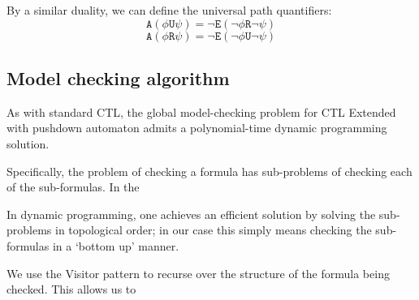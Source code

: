 \documentclass[11pt]{article}
\theoremstyle{definition}
\begin{document}
By a similar duality, we can define the universal path quantifiers:\cite{Kreutzer10}
\[ \texttt{A}(\phi\texttt{U}\psi) = \neg\texttt{E}(\neg\phi\texttt{R}\neg\psi) \]
\[ \texttt{A}(\phi\texttt{R}\psi) = \neg\texttt{E}(\neg\phi\texttt{U}\neg\psi) \]


\subsection{Model checking algorithm}

As with standard CTL, the global model-checking problem for CTL Extended with
pushdown automaton admits a polynomial-time dynamic programming solution.

Specifically, the problem of checking a formula has sub-problems of checking
each of the sub-formulas. In the %

In dynamic programming, one achieves an efficient solution by solving the
sub-problems in topological order; in our case this simply means checking the
sub-formulas in a `bottom up' manner. 


We use the Visitor pattern to recurse over the structure of the formula being
checked. This allows us to 
\end{document}
